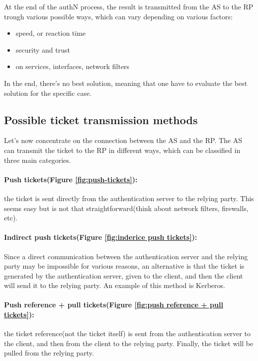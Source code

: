 At the end of the authN process, the result is transmitted from the AS
to the RP trough various possible ways, which can vary depending on
various factors:
\begin{itemize}
  \item speed, or reaction time
  \item security and trust
  \item on services, interfaces, network filters
\end{itemize}

In the end, there's no best solution, meaning that one have to
evaluate the best solution for the specific case.
\subsection{Possible ticket transmission methods}
Let's now concentrate on the connection between the AS and the RP.
The AS can transmit the ticket to the RP in different ways, which can 
be classified in three main categories.

\paragraph{Push tickets(Figure \ref{fig:push-tickets}):} the ticket is
sent directly from the authentication server to the relying party.
This seems easy but is not that straightforward(think about network 
filters, firewalls, etc).

\paragraph{Indirect push tickets(Figure \ref{fig:inderice push
tickets}):} Since a direct communication between the authentication
server and the relying party may be impossible for various reasons, an
alternative is that the ticket is generated by the authentication
server, given to the client, and then the client will send it to the
relying party. An example of this method is Kerberos.

\paragraph{Push reference + pull tickets(Figure \ref{fig:push 
reference + pull tickets}):} the ticket reference(not the ticket
itself) is sent from the authentication server to the client, and then
from the client to the relying party. Finally, the ticket will be
pulled from the relying party. 

